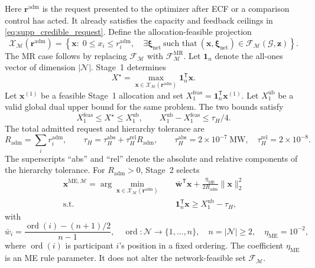\documentclass[11pt]{article}
\begin{document}
Here $\mathbf r^{\mathrm{adm}}$ is the request presented to the optimizer after
ECF or a comparison control has acted. It already satisfies the capacity and
feedback ceilings in \eqref{eq:supp_credible_request}. Define
the allocation-feasible projection
\begin{equation}
\mathcal X_{\mathcal M}(\mathbf r^{\mathrm{adm}})=
\left\{\mathbf x:\;0\le x_i\le r_i^{\mathrm{adm}},\quad
\exists\boldsymbol\xi_{\mathrm{net}}\ \text{such that}\
(\mathbf x,\boldsymbol\xi_{\mathrm{net}})\in
\mathcal F_{\mathcal M}(\mathcal G,\mathbf z)\right\}.
\label{eq:supp_projected_feasible_set}
\end{equation}
The MR case follows by replacing $\mathcal F_{\mathcal M}$ with
$\mathcal F_{\mathcal M}^{\mathrm{MR}}$. Let $\mathbf 1_n$ denote the all-ones
vector of dimension $|\mathcal N|$. Stage~1 determines
\begin{equation}
X^\star=\max_{\mathbf x\in\mathcal X_{\mathcal M}(\mathbf r^{\mathrm{adm}})}
\mathbf 1_n^{\mathsf T}\mathbf x.
\label{eq:supp_max_export_stage1}
\end{equation}
Let $\mathbf x^{(1)}$ be a feasible Stage~1 allocation and set
$X_1^{\mathrm{feas}}=\mathbf 1_n^{\mathsf T}\mathbf x^{(1)}$.
Let $X_1^{\mathrm{ub}}$ be a valid global dual upper bound for the same problem.
The two bounds satisfy
\begin{equation}
X_1^{\mathrm{feas}}\le X^\star\le X_1^{\mathrm{ub}},
\qquad X_1^{\mathrm{ub}}-X_1^{\mathrm{feas}}\le\tau_H/4.
\label{eq:supp_max_export_bounds}
\end{equation}
The total admitted request and hierarchy tolerance are
\begin{equation}
R_{\mathrm{adm}}=\sum_i r_i^{\mathrm{adm}},
\qquad
\tau_H=\tau_H^{\mathrm{abs}}+\tau_H^{\mathrm{rel}}R_{\mathrm{adm}},
\qquad
\tau_H^{\mathrm{abs}}=2\times10^{-7}\ \mathrm{MW},
\quad \tau_H^{\mathrm{rel}}=2\times10^{-8}.
\label{eq:supp_hierarchy_tolerance}
\end{equation}
The superscripts ``abs'' and ``rel'' denote the absolute and relative components
of the hierarchy tolerance.
For $R_{\mathrm{adm}}>0$, Stage~2 selects
\begin{equation}
\begin{aligned}
\mathbf x^{\mathrm{ME},\mathcal M}
=\arg\min_{\mathbf x\in\mathcal X_{\mathcal M}(\mathbf r^{\mathrm{adm}})}\quad
&\bar{\mathbf w}^{\mathsf T}\mathbf x
+\frac{\eta_{\mathrm{ME}}}{2R_{\mathrm{adm}}}\|\mathbf x\|_2^2\\
\text{s.t.}\quad
&\mathbf 1_n^{\mathsf T}\mathbf x\ge X_1^{\mathrm{ub}}-\tau_H,
\end{aligned}
\label{eq:supp_max_export_stage2}
\end{equation}
with
\begin{equation}
\bar w_i=\frac{\operatorname{ord}(i)-(n+1)/2}{n-1},
\quad \operatorname{ord}:\mathcal N\rightarrow\{1,\ldots,n\},
\quad n=|\mathcal N|\ge2,
\quad\eta_{\mathrm{ME}}=10^{-2},
\label{eq:supp_tiebreak_weights}
\end{equation}
where $\operatorname{ord}(i)$ is participant $i$'s position in a fixed ordering.
The coefficient $\eta_{\mathrm{ME}}$ is an ME rule parameter. It does not alter
the network-feasible set $\mathcal F_{\mathcal M}$.
\end{document}
